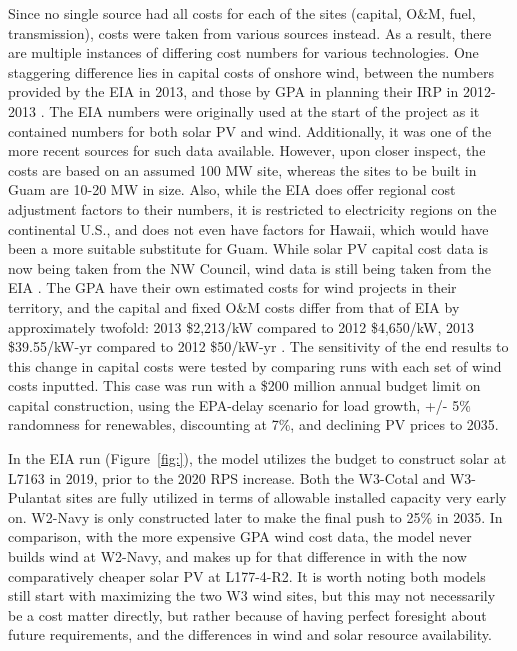 \documentclass[12pt,letterpaper,fleqn]{report}
\begin{document}
Since no single source had all costs for each of the sites (capital,
O\&M, fuel, transmission), costs were taken from various sources
instead. As a result, there are multiple instances of differing cost
numbers for various technologies. One staggering difference lies in
capital costs of onshore wind, between the numbers provided by the EIA
in 2013, and those by GPA in planning their IRP in 2012-2013
\cite{eia13, cruz13}. The EIA numbers were originally used at the
start of the project as it contained numbers for both solar PV and
wind. Additionally, it was one of the more recent sources for such
data available. However, upon closer inspect, the costs are based on
an assumed 100 MW site, whereas the sites to be built in Guam are
10-20 MW in size. Also, while the EIA does offer regional cost
adjustment factors to their numbers, it is restricted to electricity
regions on the continental U.S., and does not even have factors for
Hawaii, which would have been a more suitable substitute for
Guam. While solar PV capital cost data is now being taken from the NW
Council, wind data is still being taken from the EIA
\cite{simmons13}. The GPA have their own estimated costs for wind
projects in their territory, and the capital and fixed O\&M costs
differ from that of EIA by approximately twofold: 2013 \$2,213/kW
compared to 2012 \$4,650/kW, 2013 \$39.55/kW-yr compared to 2012
\$50/kW-yr \cite{eia13, cruz13}. The sensitivity of the end results to
this change in capital costs were tested by comparing runs with each
set of wind costs inputted. This case was run with a \$200 million
annual budget limit on capital construction, using the EPA-delay
scenario for load growth, +/- 5\% randomness for renewables,
discounting at 7\%, and declining PV prices to 2035.

In the EIA run (Figure~\ref{fig:}), the model utilizes the budget to
construct solar at L7163 in 2019, prior to the 2020 RPS increase. Both
the W3-Cotal and W3-Pulantat sites are fully utilized in terms of
allowable installed capacity very early on. W2-Navy is only
constructed later to make the final push to 25\% in 2035. In
comparison, with the more expensive GPA wind cost data, the model
never builds wind at W2-Navy, and makes up for that difference in with
the now comparatively cheaper solar PV at L177-4-R2. It is worth
noting both models still start with maximizing the two W3 wind sites,
but this may not necessarily be a cost matter directly, but rather
because of having perfect foresight about future requirements, and the
differences in wind and solar resource availability.
\end{document}
